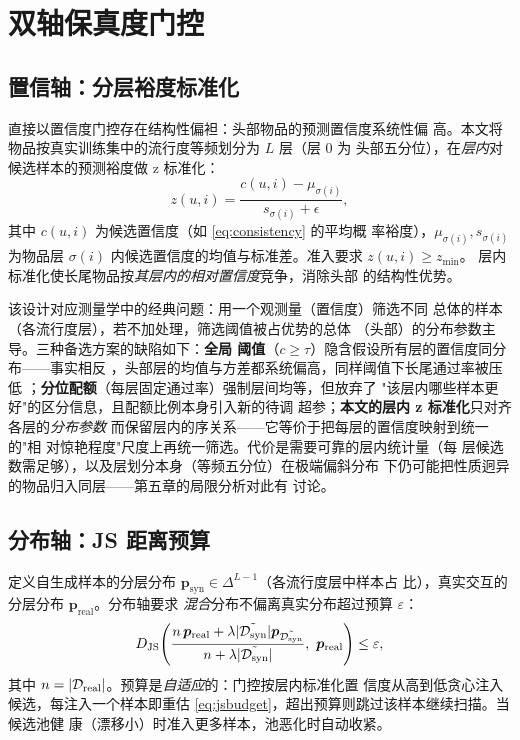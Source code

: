 \section{双轴保真度门控}\label{sec:gate}
\subsection{置信轴：分层裕度标准化}
直接以置信度门控存在结构性偏袒：头部物品的预测置信度系统性偏
高。本文将物品按真实训练集中的流行度等频划分为 $L$ 层（层 0 为
头部五分位），在\emph{层内}对候选样本的预测裕度做 z 标准化：
\begin{equation}\label{eq:znorm}
z(u, i) = \frac{c(u, i) - \mu_{\sigma(i)}}{s_{\sigma(i)} + \epsilon},
\end{equation}
其中 $c(u,i)$ 为候选置信度（如 \eqref{eq:consistency} 的平均概
率裕度），$\mu_{\sigma(i)}, s_{\sigma(i)}$ 为物品层 $\sigma(i)$
内候选置信度的均值与标准差。准入要求 $z(u,i) \geq z_{\min}$。
层内标准化使长尾物品按\emph{其层内的相对置信度}竞争，消除头部
的结构性优势。

该设计对应测量学中的经典问题：用一个观测量（置信度）筛选不同
总体的样本（各流行度层），若不加处理，筛选阈值被占优势的总体
（头部）的分布参数主导。三种备选方案的缺陷如下：\textbf{全局
阈值}（$c \geq \tau$）隐含假设所有层的置信度同分布——事实相反
，头部层的均值与方差都系统偏高，同样阈值下长尾通过率被压低
；\textbf{分位配额}（每层固定通过率）强制层间均等，但放弃了
"该层内哪些样本更好"的区分信息，且配额比例本身引入新的待调
超参；\textbf{本文的层内 z 标准化}只对齐各层的\emph{分布参数}
而保留层内的序关系——它等价于把每层的置信度映射到统一的"相
对惊艳程度"尺度上再统一筛选。代价是需要可靠的层内统计量（每
层候选数需足够），以及层划分本身（等频五分位）在极端偏斜分布
下仍可能把性质迥异的物品归入同层——第五章的局限分析对此有
讨论。

\subsection{分布轴：JS 距离预算}
定义自生成样本的分层分布
$\bm{p}_{\mathrm{syn}} \in \Delta^{L-1}$（各流行度层中样本占
比），真实交互的分层分布 $\bm{p}_{\mathrm{real}}$。分布轴要求
\emph{混合}分布不偏离真实分布超过预算 $\varepsilon$：
\begin{equation}\label{eq:jsbudget}
D_{\mathrm{JS}}\!\left(
\frac{n\,\bm{p}_{\mathrm{real}} +
\lambda |\tilde{\Dsyn}| \bm{p}_{\tilde{\Dsyn}}}
{n + \lambda|\tilde{\Dsyn}|},\ 
\bm{p}_{\mathrm{real}}\right) \leq \varepsilon,
\end{equation}
其中 $n = |\mathcal{D}_{\mathrm{real}}|$。预算是\emph{自适应}的：门控按层内标准化置
信度从高到低贪心注入候选，每注入一个样本即重估
\eqref{eq:jsbudget}，超出预算则跳过该样本继续扫描。当候选池健
康（漂移小）时准入更多样本，池恶化时自动收紧。

